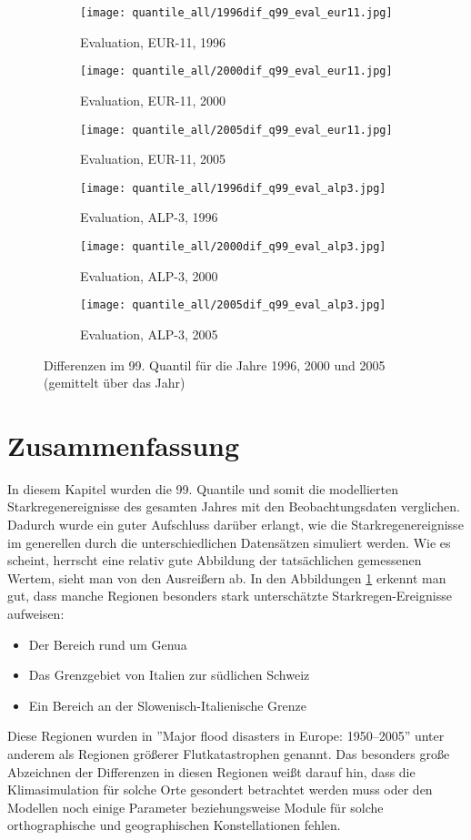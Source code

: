 \begin{figure}
	\begin{subfigure}{0.32\textwidth}
		\texttt{[image: quantile\_all/1996dif\_q99\_eval\_eur11.jpg]}
		\caption{Evaluation, EUR-11, 1996}
	\end{subfigure}
	\begin{subfigure}{0.32\textwidth}
		\texttt{[image: quantile\_all/2000dif\_q99\_eval\_eur11.jpg]}
		\caption{Evaluation, EUR-11, 2000}
	\end{subfigure}
	\begin{subfigure}{0.32\textwidth}
		\texttt{[image: quantile\_all/2005dif\_q99\_eval\_eur11.jpg]}
		\caption{Evaluation, EUR-11, 2005}
	\end{subfigure}
	\begin{subfigure}{0.32\textwidth}
		\texttt{[image: quantile\_all/1996dif\_q99\_eval\_alp3.jpg]}
		\caption{Evaluation, ALP-3, 1996}
	\end{subfigure}
	\begin{subfigure}{0.32\textwidth}
		\texttt{[image: quantile\_all/2000dif\_q99\_eval\_alp3.jpg]}
		\caption{Evaluation, ALP-3, 2000}
	\end{subfigure}
	\begin{subfigure}{0.32\textwidth}
		\texttt{[image: quantile\_all/2005dif\_q99\_eval\_alp3.jpg]}
		\caption{Evaluation, ALP-3, 2005}
	\end{subfigure}
	\caption{Differenzen im 99. Quantil für die Jahre 1996, 2000 und 2005 (gemittelt über das Jahr)}
	\label{fig:quantile_alp3}
\end{figure}

\section{Zusammenfassung}
In diesem Kapitel wurden die 99. Quantile und somit die modellierten Starkregenereignisse des gesamten Jahres mit den Beobachtungsdaten verglichen. Dadurch wurde ein guter Aufschluss darüber erlangt, wie die Starkregenereignisse im generellen durch die unterschiedlichen Datensätzen simuliert werden. Wie es scheint, herrscht eine relativ gute Abbildung der tatsächlichen gemessenen Wertem, sieht man von den Ausreißern ab. In den Abbildungen \ref{fig:quantile_alp3} erkennt man gut, dass manche Regionen besonders stark unterschätzte Starkregen-Ereignisse aufweisen: 
\begin{itemize}
	\item Der Bereich rund um Genua
	\item Das Grenzgebiet von Italien zur südlichen Schweiz
	\item Ein Bereich an der Slowenisch-Italienische Grenze
\end{itemize}
Diese Regionen wurden in ''Major flood disasters in Europe: 1950–2005'' \cite{barredo_major_2007} unter anderem als Regionen größerer Flutkatastrophen genannt. Das besonders große Abzeichnen der Differenzen in diesen Regionen weißt darauf hin, dass die Klimasimulation für solche Orte gesondert betrachtet werden muss oder den Modellen noch einige Parameter beziehungsweise Module für solche orthographische und geographischen Konstellationen fehlen.